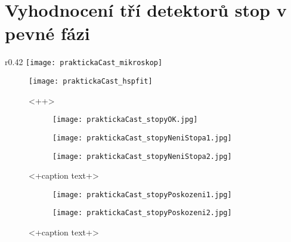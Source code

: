 \chapter{Vyhodnocení tří detektorů stop v pevné fázi}

\begin{wrapfigure}{r}{0.42\textwidth}
  \centering
  \texttt{[image: praktickaCast\_mikroskop]}
  \caption{<++> \cite{dosis_HSP1000}}
  \label{fig:praktickaCast_mikroskop}
\end{wrapfigure}

\begin{figure}[h]
  \centering
  \texttt{[image: praktickaCast\_hspfit]}
  \caption{<++> \cite{dosis_HSP1000}}
  \label{fig:praktickaCast_hspfit}
\end{figure}

\begin{figure}[h]
  \centering
  \begin{subfigure}{0.7\textwidth}
	\texttt{[image: praktickaCast\_stopyOK.jpg]}
	\caption{}
  \end{subfigure}
  \begin{subfigure}{0.7\textwidth}
	\texttt{[image: praktickaCast\_stopyNeniStopa1.jpg]}
	\caption{}
  \end{subfigure}
  \begin{subfigure}{0.7\textwidth}
	\texttt{[image: praktickaCast\_stopyNeniStopa2.jpg]}
	\caption{}
  \end{subfigure}
  \caption{<+caption text+>}
  \label{fig:praktickaCast_stopy}
\end{figure}

\begin{figure}[h]
  \centering
  \begin{subfigure}{0.7\textwidth}
	\texttt{[image: praktickaCast\_stopyPoskozeni1.jpg]}
	\caption{}
  \end{subfigure}
  \begin{subfigure}{0.7\textwidth}
	\texttt{[image: praktickaCast\_stopyPoskozeni2.jpg]}
	\caption{}
  \end{subfigure}
  \caption{<+caption text+>}
  \label{fig:praktickaCast_stopyPoskozeni}
\end{figure}

